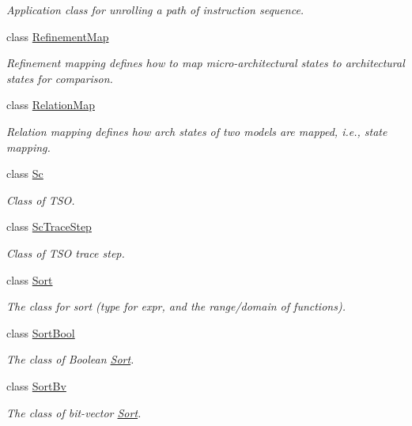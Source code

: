 \begin{DoxyCompactItemize}
\begin{DoxyCompactList}\small\item\em Application class for unrolling a path of instruction sequence. \end{DoxyCompactList}\item 
class \mbox{\hyperlink{classilang_1_1_refinement_map}{Refinement\+Map}}
\begin{DoxyCompactList}\small\item\em Refinement mapping defines how to map micro-\/architectural states to architectural states for comparison. \end{DoxyCompactList}\item 
class \mbox{\hyperlink{classilang_1_1_relation_map}{Relation\+Map}}
\begin{DoxyCompactList}\small\item\em Relation mapping defines how arch states of two models are mapped, i.\+e., state mapping. \end{DoxyCompactList}\item 
class \mbox{\hyperlink{classilang_1_1_sc}{Sc}}
\begin{DoxyCompactList}\small\item\em Class of T\+SO. \end{DoxyCompactList}\item 
class \mbox{\hyperlink{classilang_1_1_sc_trace_step}{Sc\+Trace\+Step}}
\begin{DoxyCompactList}\small\item\em Class of T\+SO trace step. \end{DoxyCompactList}\item 
class \mbox{\hyperlink{classilang_1_1_sort}{Sort}}
\begin{DoxyCompactList}\small\item\em The class for sort (type for expr, and the range/domain of functions). \end{DoxyCompactList}\item 
class \mbox{\hyperlink{classilang_1_1_sort_bool}{Sort\+Bool}}
\begin{DoxyCompactList}\small\item\em The class of Boolean \mbox{\hyperlink{classilang_1_1_sort}{Sort}}. \end{DoxyCompactList}\item 
class \mbox{\hyperlink{classilang_1_1_sort_bv}{Sort\+Bv}}
\begin{DoxyCompactList}\small\item\em The class of bit-\/vector \mbox{\hyperlink{classilang_1_1_sort}{Sort}}. \end{DoxyCompactList}\item 

\end{DoxyCompactItemize}
